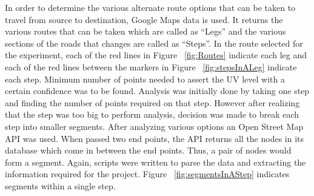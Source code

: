 \documentclass[12pt,fullpage,doublespace]{article}
\begin{document}
In order to determine the various alternate route options that can be taken to travel from source to destination, Google Maps \cite{googleMapsOriginal} data is used. It returns the various routes that can be taken which are called as “Legs” and the various sections of the roads that changes are called as “Steps”. In the route selected for the experiment, each of the red lines in Figure ~\ref{fig:Routes} indicate each leg and each of the red lines between the markers in Figure ~\ref{fig:stepsInALeg} indicate each step. Minimum number of points needed to assert the UV level with a certain confidence was to be found. Analysis was initially done by taking one step and finding the number of points required on that step. However after realizing that the step was too big to perform analysis, decision was made to break each step into smaller segments. After analyzing various options an Open Street Map API  \cite{openStreetMapsDirections} was used. When passed two end points, the API returns all the nodes in its database which come in between the end points. Thus, a pair of nodes would form a segment. Again, scripts were written to parse the data and extracting the information required for the project. Figure ~\ref{fig:segmentsInAStep} indicates segments within a single step. 
\end{document}
